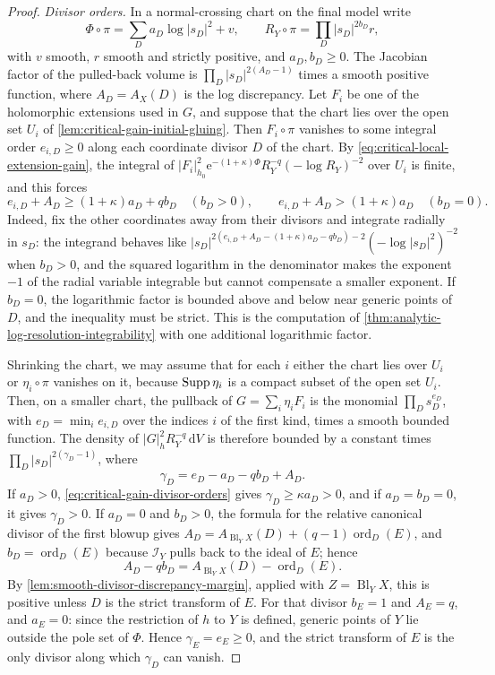 \begin{proof}
\emph{Divisor orders.} In a normal-crossing chart on the final model write
\[
 \Phi\circ\pi=\sum_D a_D\log|s_D|^2+v,\qquad
 R_Y\circ\pi=\prod_D|s_D|^{2b_D}r,
\]
with $v$ smooth, $r$ smooth and strictly positive, and $a_D,b_D\geq0$. The Jacobian factor of the pulled-back volume is $\prod_D|s_D|^{2(A_D-1)}$ times a smooth positive function, where $A_D=A_X(D)$ is the log discrepancy. Let $F_i$ be one of the holomorphic extensions used in $G$, and suppose that the chart lies over the open set $U_i$ of \cref{lem:critical-gain-initial-gluing}. Then $F_i\circ\pi$ vanishes to some integral order $e_{i,D}\geq0$ along each coordinate divisor $D$ of the chart. By \eqref{eq:critical-local-extension-gain}, the integral of $|F_i|_{h_0}^2\mathrm e^{-(1+\kappa)\Phi}R_Y^{-q}(-\log R_Y)^{-2}$ over $U_i$ is finite, and this forces
\begin{equation}\label{eq:critical-gain-divisor-orders}
 e_{i,D}+A_D\geq(1+\kappa)a_D+qb_D\quad(b_D>0),
 \qquad e_{i,D}+A_D>(1+\kappa)a_D\quad(b_D=0).
\end{equation}
Indeed, fix the other coordinates away from their divisors and integrate radially in $s_D$: the integrand behaves like $|s_D|^{2(e_{i,D}+A_D-(1+\kappa)a_D-qb_D)-2}(-\log|s_D|^2)^{-2}$ when $b_D>0$, and the squared logarithm in the denominator makes the exponent $-1$ of the radial variable integrable but cannot compensate a smaller exponent. If $b_D=0$, the logarithmic factor is bounded above and below near generic points of $D$, and the inequality must be strict. This is the computation of \cref{thm:analytic-log-resolution-integrability} with one additional logarithmic factor.

Shrinking the chart, we may assume that for each $i$ either the chart lies over $U_i$ or $\eta_i\circ\pi$ vanishes on it, because $\operatorname{Supp}\eta_i$ is a compact subset of the open set $U_i$. Then, on a smaller chart, the pullback of $G=\sum_i\eta_iF_i$ is the monomial $\prod_Ds_D^{e_D}$, with $e_D=\min_ie_{i,D}$ over the indices $i$ of the first kind, times a smooth bounded function. The density of $|G|_h^2R_Y^{-q}\,\mathrm dV$ is therefore bounded by a constant times $\prod_D|s_D|^{2(\gamma_D-1)}$, where
\[
 \gamma_D=e_D-a_D-qb_D+A_D.
\]
If $a_D>0$, \eqref{eq:critical-gain-divisor-orders} gives $\gamma_D\geq\kappa a_D>0$, and if $a_D=b_D=0$, it gives $\gamma_D>0$. If $a_D=0$ and $b_D>0$, the formula for the relative canonical divisor of the first blowup gives $A_D=A_{\operatorname{Bl}_YX}(D)+(q-1)\operatorname{ord}_D(E)$, and $b_D=\operatorname{ord}_D(E)$ because $\mathcal I_Y$ pulls back to the ideal of $E$; hence
\[
 A_D-qb_D=A_{\operatorname{Bl}_YX}(D)-\operatorname{ord}_D(E).
\]
By \cref{lem:smooth-divisor-discrepancy-margin}, applied with $Z=\operatorname{Bl}_YX$, this is positive unless $D$ is the strict transform of $E$. For that divisor $b_E=1$ and $A_E=q$, and $a_E=0$: since the restriction of $h$ to $Y$ is defined, generic points of $Y$ lie outside the pole set of $\Phi$. Hence $\gamma_E=e_E\geq0$, and the strict transform of $E$ is the only divisor along which $\gamma_D$ can vanish.


\end{proof}
